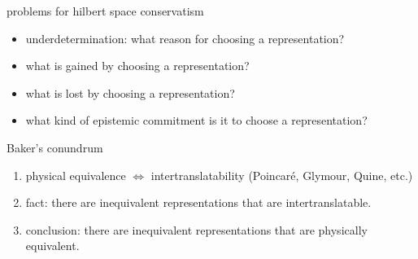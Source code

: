 \documentclass{beamer}
\begin{document}






\begin{frame}{problems for hilbert space conservatism}

\begin{itemize}
\item underdetermination: what reason for choosing a representation?
\item what is gained by choosing a representation?
\item what is lost by choosing a representation?
\item what kind of epistemic commitment is it to choose a
  representation? 
\end{itemize}

\end{frame}



\begin{frame}{Baker's conundrum}

\begin{enumerate}
\item physical equivalence $\Leftrightarrow$ intertranslatability
  (Poincar\'e, Glymour, Quine, etc.)
\item fact: there are inequivalent representations that are
  intertranslatable.
\item conclusion: there are inequivalent representations that are
  physically equivalent.
\end{enumerate}


\end{frame}
\end{document}
